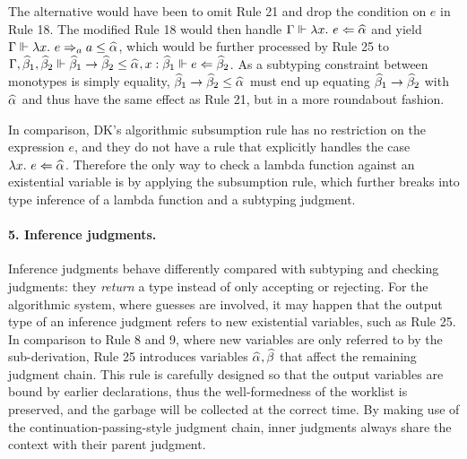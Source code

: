 The alternative would have been to omit Rule 21 and drop the condition on $e$
in Rule 18. The modified Rule 18 would then handle $\Gm \Vdash \lam e \Lto \al$
and yield $\Gm \Vdash \lam e \To_a a \le \al$, which would be further processed
by Rule 25 to $\Gm, \bt[1], \bt[2] \Vdash \bt[1] \to \bt[2] \le \al, x:\bt[1] \Vdash e \Lto \bt[2]$.
As a subtyping constraint between monotypes is simply equality, $\bt[1] \to \bt[2] \le \al$
must end up equating $\bt[1] \to \bt[2]$ with $\al$ and thus have the same effect as Rule 21, but in a more roundabout
fashion.

In comparison,
DK's algorithmic subsumption rule has no restriction on the expression $e$,
and they do not have a rule that explicitly handles the case $\lam e \Lto \al$.
Therefore the only way to check a lambda function against an existential variable
is by applying the subsumption rule, which further breaks into
type inference of a lambda function and a subtyping judgment.
% 

\paragraph{\bf 5. Inference judgments.}
Inference judgments behave differently compared with subtyping and checking judgments:
they \emph{return} a type instead of only accepting or rejecting.
For the algorithmic system, where guesses are involved,
it may happen that the output type of an inference judgment refers to new existential variables,
such as Rule 25.
In comparison to Rule 8 and 9, where new variables are
only referred to by the sub-derivation,
Rule 25 introduces variables $\al, \bt$ that affect the remaining judgment chain.
This rule is carefully designed so that the output variables are bound by earlier declarations,
thus the well-formedness of the worklist is preserved,
and the garbage will be collected at the correct time.
By making use of the continuation-passing-style judgment chain,
inner judgments always share the context with their parent judgment.

